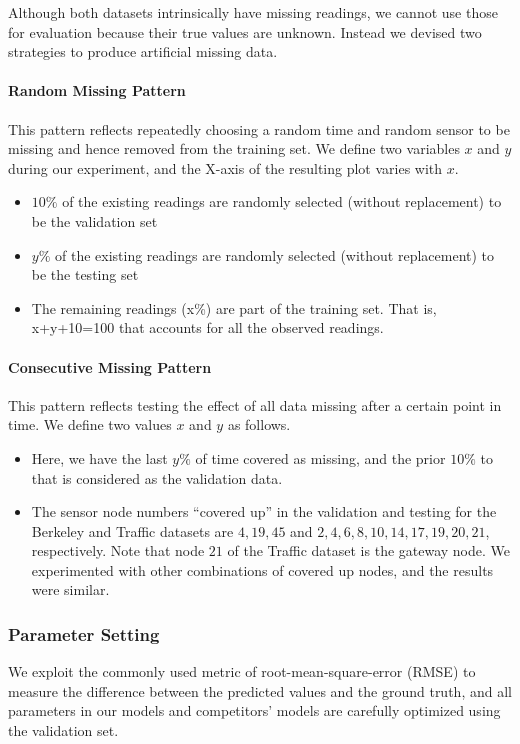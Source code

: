Although both datasets intrinsically have missing readings, we cannot use those for evaluation because their true values are unknown.
Instead we devised two strategies to produce artificial missing data.
\paragraph*{Random Missing Pattern}
This pattern reflects repeatedly choosing a random time and random sensor to be missing and hence removed from the training set.
%
We define two variables $x$ and $y$ during our experiment, and the X-axis of the resulting plot varies with $x$.
\begin{itemize}
\item $10\%$ of the existing readings are randomly selected (without replacement) to be the validation set
\item $y\%$ of the existing readings are randomly selected (without replacement) to be the testing set
\item The remaining readings (x\%) are part of the training set. That is, x+y+10=100 that accounts for all the observed readings.
\end{itemize}

\paragraph*{Consecutive Missing Pattern}
This pattern reflects testing the effect of all data missing after a certain point in time.
We define two values $x$ and $y$ as follows.
\begin{itemize}
\item Here, we have the last $y\%$ of time covered as missing, and the prior $10\%$ to that is considered as the validation data.
\item The sensor node numbers ``covered up'' in the validation and testing for the Berkeley and Traffic datasets are ${4,19,45}$ and ${2,4,6,8,10,14,17,19,20,21}$, respectively.
Note that node $21$ of the Traffic dataset is the gateway node.
We experimented with other combinations of covered up nodes, and the results were similar.
\end{itemize}

\subsubsection{Parameter Setting}

We exploit the commonly used metric of root-mean-square-error (RMSE)
to measure the difference between the predicted values and the ground
truth, and all parameters in our models and competitors' models are
carefully optimized using the validation set.

